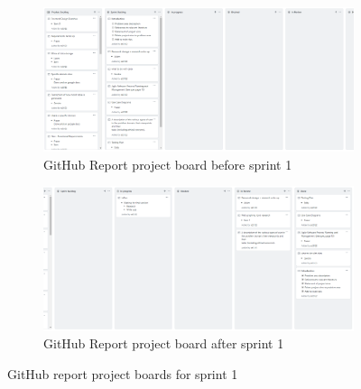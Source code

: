 \documentclass[10pt]{report}
\begin{document}
\begin{figure}[!h]
\centering
\begin{subfigure}{\textwidth}
	\centering	
	\includegraphics[width=1\linewidth]{git-report-1-before.png}
	\caption{GitHub Report project board before sprint 1}
	\label{fig:agileapp-rb1}
\end{subfigure}
\begin{subfigure}{\textwidth}
	\centering	
	\includegraphics[width=1\linewidth]{git-report-1-after.png}
	\caption{GitHub Report project board after sprint 1}
	\label{fig:agileapp-ra1}
\end{subfigure}

\caption{GitHub report project boards for sprint 1}

\end{figure}

\newpage
\end{document}
